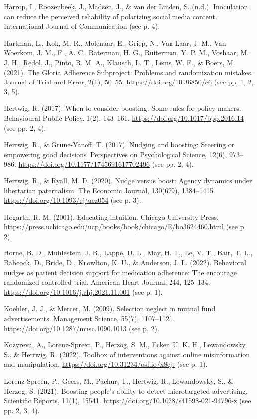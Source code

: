 \documentclass[reflection, authordate]{jote-new-article}
\begin{document}
Harrop, I., Roozenbeek, J., Madsen, J., \& van der Linden, S. (n.d.). Inoculation can reduce the perceived reliability of polarizing social media content. International Journal of Communication (see p. 4).

Hartman, L., Kok, M. R., Molenaar, E., Griep, N., Van Laar, J. M., Van Woerkom, J. M., F., A. C., Raterman, H. G., Ruiterman, Y. P. M., Voshaar, M. J. H., Redol, J., Pinto, R. M. A., Klausch, L. T., Lems, W. F., \& Boers, M. (2021). The Gloria Adherence Subproject: Problems and randomization mistakes. Journal of Trial and Error, 2(1), 50–55. \url{https://doi.org/10.36850/e6} (see pp. 1, 2, 3, 5).

Hertwig, R. (2017). When to consider boosting: Some rules for policy-makers. Behavioural Public Policy, 1(2), 143–161. \url{https://doi.org/10.1017/bpp.2016.14} (see pp. 2, 4).

Hertwig, R., \& Grüne-Yanoff, T. (2017). Nudging and boosting: Steering or empowering good decisions. Perspectives on Psychological Science, 12(6), 973–986. \url{https://doi.org/10.1177/1745691617702496} (see pp. 2, 4).

Hertwig, R., \& Ryall, M. D. (2020). Nudge versus boost: Agency dynamics under libertarian paternalism. The Economic Journal, 130(629), 1384–1415. \url{https://doi.org/10.1093/ej/uez054} (see p. 3).

Hogarth, R. M. (2001). Educating intuition. Chicago University Press. \url{https://press.uchicago.edu/ucp/books/book/chicago/E/bo3624460.html} (see p. 2).

Horne, B. D., Muhlestein, J. B., Lappé, D. L., May, H. T., Le, V. T., Bair, T. L., Babcock, D., Bride, D., Knowlton, K. U., \& Anderson, J. L. (2022). Behavioral nudges as patient decision support for medication adherence: The encourage randomized controlled trial. American Heart Journal, 244, 125–134. \url{https://doi.org/10.1016/j.ahj.2021.11.001} (see p. 1).

Koehler, J. J., \& Mercer, M. (2009). Selection neglect in mutual fund advertisements. Management Science, 55(7), 1107–1121. \url{https://doi.org/10.1287/mnsc.1090.1013} (see p. 2).

Kozyreva, A., Lorenz-Spreen, P., Herzog, S. M., Ecker, U. K. H., Lewandowsky, S., \& Hertwig, R. (2022). Toolbox of interventions against online misinformation and manipulation. \url{https://doi.org/10.31234/osf.io/x8ejt} (see p. 1).

Lorenz-Spreen, P., Geers, M., Pachur, T., Hertwig, R., Lewandowsky, S., \& Herzog, S. (2021). Boosting people’s ability to detect microtargeted advertising. Scientific Reports, 11(1), 15541. \url{https://doi.org/10.1038/s41598-021-94796-z} (see pp. 2, 3, 4).
\end{document}
